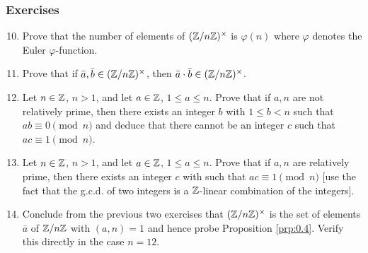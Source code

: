 \documentclass[../notes.tex]{subfiles}
\begin{document}
\subsubsection*{Exercises}
\begin{enumerate}[label={\textbf{\arabic*.}},ref={0.3.\arabic*}]
    \setcounter{enumi}{9}
    \item \label{exr:0.3.10}Prove that the number of elements of $(\mathbb{Z}/n\mathbb{Z})^\times$ is $\varphi(n)$ where $\varphi$ denotes the Euler $\varphi$-function.
    \item \label{exr:0.3.11}Prove that if $\bar{a},\bar{b}\in(\mathbb{Z}/n\mathbb{Z})^\times$, then $\bar{a}\cdot\bar{b}\in(\mathbb{Z}/n\mathbb{Z})^\times$.
    \item \label{exr:0.3.12}Let $n\in\mathbb{Z}$, $n>1$, and let $a\in\mathbb{Z}$, $1\leq a\leq n$. Prove that if $a,n$ are not relatively prime, then there exists an integer $b$ with $1\leq b<n$ such that $ab\equiv 0\pmod n$ and deduce that there cannot be an integer $c$ such that $ac\equiv 1\pmod n$.
    \item \label{exr:0.3.13}Let $n\in\mathbb{Z}$, $n>1$, and let $a\in\mathbb{Z}$, $1\leq a\leq n$. Prove that if $a,n$ are relatively prime, then there exists an integer $c$ with such that $ac\equiv 1\pmod n$ [use the fact that the g.c.d. of two integers is a $\mathbb{Z}$-linear combination of the integers].
    \item \label{exr:0.3.14}Conclude from the previous two exercises that $(\mathbb{Z}/n\mathbb{Z})^\times$ is the set of elements $\bar{a}$ of $\mathbb{Z}/n\mathbb{Z}$ with $(a,n)=1$ and hence probe Proposition \ref{prp:0.4}. Verify this directly in the case $n=12$.
\end{enumerate}
\end{document}
